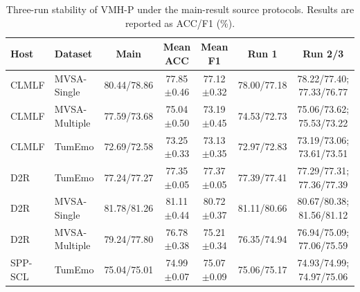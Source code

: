 \begin{table}[t]
\centering
\caption{Three-run stability of VMH-P under the main-result source protocols. Results are reported as ACC/F1 (\%).}
\label{tab:main_source_protocol_3seed}
\footnotesize
\begin{tabular}{llccccc}
\toprule
\textbf{Host} & \textbf{Dataset} & \textbf{Main} & \textbf{Mean ACC} & \textbf{Mean F1} & \textbf{Run 1} & \textbf{Run 2/3} \\
\midrule
CLMLF & MVSA-Single & 80.44/78.86 & 77.85$\pm$0.46 & 77.12$\pm$0.32 & 78.00/77.18 & 78.22/77.40; 77.33/76.77 \\
CLMLF & MVSA-Multiple & 77.59/73.68 & 75.04$\pm$0.50 & 73.19$\pm$0.45 & 74.53/72.73 & 75.06/73.62; 75.53/73.22 \\
CLMLF & TumEmo & 72.69/72.58 & 73.25$\pm$0.33 & 73.13$\pm$0.35 & 72.97/72.83 & 73.19/73.06; 73.61/73.51 \\
D2R & TumEmo & 77.24/77.27 & 77.35$\pm$0.05 & 77.37$\pm$0.05 & 77.39/77.41 & 77.29/77.31; 77.36/77.39 \\
D2R & MVSA-Single & 81.78/81.26 & 81.11$\pm$0.44 & 80.72$\pm$0.37 & 81.11/80.66 & 80.67/80.38; 81.56/81.12 \\
D2R & MVSA-Multiple & 79.24/77.80 & 76.78$\pm$0.38 & 75.21$\pm$0.34 & 76.35/74.94 & 76.94/75.09; 77.06/75.59 \\
SPP-SCL & TumEmo & 75.04/75.01 & 74.99$\pm$0.07 & 75.07$\pm$0.09 & 75.06/75.17 & 74.93/74.99; 74.97/75.06 \\
\bottomrule
\end{tabular}
\end{table}
